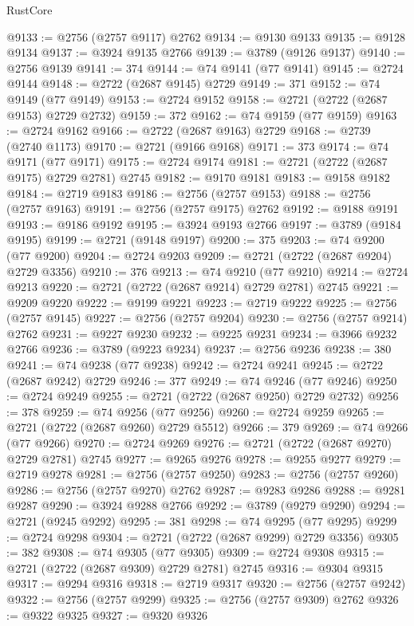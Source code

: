 \begin{lexlean}{RustCore}
\begin{coremodule}
@9133 := @2756 (@2757 @9117) @2762
@9134 := @9130 @9133
@9135 := @9128 @9134
@9137 := @3924 @9135 @2766
@9139 := @3789 (@9126 @9137)
@9140 := @2756 @9139
@9141 := 374
@9144 := @74 @9141 (@77 @9141)
@9145 := @2724 @9144
@9148 := @2722 (@2687 @9145) @2729
@9149 := 371
@9152 := @74 @9149 (@77 @9149)
@9153 := @2724 @9152
@9158 := @2721 (@2722 (@2687 @9153) @2729 @2732)
@9159 := 372
@9162 := @74 @9159 (@77 @9159)
@9163 := @2724 @9162
@9166 := @2722 (@2687 @9163) @2729
@9168 := @2739 (@2740 @1173)
@9170 := @2721 (@9166 @9168)
@9171 := 373
@9174 := @74 @9171 (@77 @9171)
@9175 := @2724 @9174
@9181 := @2721 (@2722 (@2687 @9175) @2729 @2781) @2745
@9182 := @9170 @9181
@9183 := @9158 @9182
@9184 := @2719 @9183
@9186 := @2756 (@2757 @9153)
@9188 := @2756 (@2757 @9163)
@9191 := @2756 (@2757 @9175) @2762
@9192 := @9188 @9191
@9193 := @9186 @9192
@9195 := @3924 @9193 @2766
@9197 := @3789 (@9184 @9195)
@9199 := @2721 (@9148 @9197)
@9200 := 375
@9203 := @74 @9200 (@77 @9200)
@9204 := @2724 @9203
@9209 := @2721 (@2722 (@2687 @9204) @2729 @3356)
@9210 := 376
@9213 := @74 @9210 (@77 @9210)
@9214 := @2724 @9213
@9220 := @2721 (@2722 (@2687 @9214) @2729 @2781) @2745
@9221 := @9209 @9220
@9222 := @9199 @9221
@9223 := @2719 @9222
@9225 := @2756 (@2757 @9145)
@9227 := @2756 (@2757 @9204)
@9230 := @2756 (@2757 @9214) @2762
@9231 := @9227 @9230
@9232 := @9225 @9231
@9234 := @3966 @9232 @2766
@9236 := @3789 (@9223 @9234)
@9237 := @2756 @9236
@9238 := 380
@9241 := @74 @9238 (@77 @9238)
@9242 := @2724 @9241
@9245 := @2722 (@2687 @9242) @2729
@9246 := 377
@9249 := @74 @9246 (@77 @9246)
@9250 := @2724 @9249
@9255 := @2721 (@2722 (@2687 @9250) @2729 @2732)
@9256 := 378
@9259 := @74 @9256 (@77 @9256)
@9260 := @2724 @9259
@9265 := @2721 (@2722 (@2687 @9260) @2729 @5512)
@9266 := 379
@9269 := @74 @9266 (@77 @9266)
@9270 := @2724 @9269
@9276 := @2721 (@2722 (@2687 @9270) @2729 @2781) @2745
@9277 := @9265 @9276
@9278 := @9255 @9277
@9279 := @2719 @9278
@9281 := @2756 (@2757 @9250)
@9283 := @2756 (@2757 @9260)
@9286 := @2756 (@2757 @9270) @2762
@9287 := @9283 @9286
@9288 := @9281 @9287
@9290 := @3924 @9288 @2766
@9292 := @3789 (@9279 @9290)
@9294 := @2721 (@9245 @9292)
@9295 := 381
@9298 := @74 @9295 (@77 @9295)
@9299 := @2724 @9298
@9304 := @2721 (@2722 (@2687 @9299) @2729 @3356)
@9305 := 382
@9308 := @74 @9305 (@77 @9305)
@9309 := @2724 @9308
@9315 := @2721 (@2722 (@2687 @9309) @2729 @2781) @2745
@9316 := @9304 @9315
@9317 := @9294 @9316
@9318 := @2719 @9317
@9320 := @2756 (@2757 @9242)
@9322 := @2756 (@2757 @9299)
@9325 := @2756 (@2757 @9309) @2762
@9326 := @9322 @9325
@9327 := @9320 @9326

\end{coremodule}
\end{lexlean}

